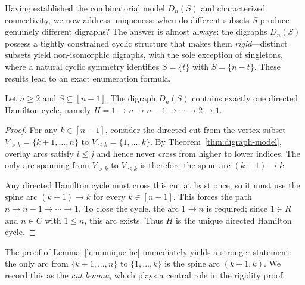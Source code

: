 
Having established the combinatorial model $D_n(S)$ and characterized
connectivity, we now address uniqueness: when do different subsets $S$ produce
genuinely different digraphs? The answer is almost always: the digraphs
$D_n(S)$ possess a tightly constrained cyclic structure that makes them
\emph{rigid}---distinct subsets yield non-isomorphic digraphs, with the sole
exception of singletons, where a natural cyclic symmetry identifies $S = \{t\}$
with $S = \{n - t\}$. These results lead to an exact enumeration formula.


\begin{lemma}\label{lem:unique-hc}
Let $n \ge 2$ and $S \subseteq [n-1]$. The digraph $D_n(S)$ contains exactly
one directed Hamilton cycle, namely
$H = 1 \to n \to n{-}1 \to \cdots \to 2 \to 1$.
\end{lemma}
\begin{proof}
For any $k \in [n-1]$, consider the directed cut from the vertex subset
$V_{>k} = \{k{+}1, \dots, n\}$ to $V_{\le k} = \{1, \dots, k\}$. By
Theorem~\ref{thm:digraph-model}, overlay arcs satisfy $i \le j$ and hence
never cross from higher to lower indices. The only arc spanning from $V_{>k}$
to $V_{\le k}$ is therefore the spine arc $(k{+}1) \to k$.

Any directed Hamilton cycle must cross this cut at least once, so it must use
the spine arc $(k{+}1) \to k$ for every $k \in [n-1]$. This forces the path
$n \to n{-}1 \to \cdots \to 1$. To close the cycle, the arc $1 \to n$ is
required; since $1 \in R$ and $n \in C$ with $1 \le n$, this arc exists.
Thus $H$ is the unique directed Hamilton cycle.
\end{proof}

\begin{remark}
The proof of Lemma~\ref{lem:unique-hc} immediately yields a stronger
statement: the only arc from $\{k{+}1, \dots, n\}$ to $\{1, \dots, k\}$ is the
spine arc $(k{+}1, k)$. We record this as the \emph{cut lemma}, which plays a
central role in the rigidity proof.
\end{remark}

